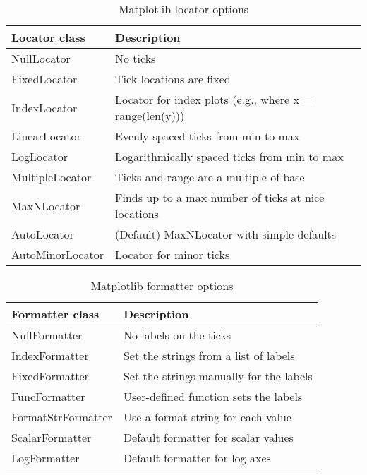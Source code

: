 \begin{table}
    \centering
    \caption{Matplotlib locator options}
    \label{Matplotlib locator options}
    \begin{tabular}{ll}
        \hline
        Locator class    & Description                                             \\
        \hline
        NullLocator      & No ticks                                                \\
        FixedLocator     & Tick locations are fixed                                \\
        IndexLocator     & Locator for index plots (e.g., where x = range(len(y))) \\
        LinearLocator    & Evenly spaced ticks from min to max                     \\
        LogLocator       & Logarithmically spaced ticks from min to max            \\
        MultipleLocator  & Ticks and range are a multiple of base                  \\
        MaxNLocator      & Finds up to a max number of ticks at nice locations     \\
        AutoLocator      & (Default) MaxNLocator with simple defaults              \\
        AutoMinorLocator & Locator for minor ticks                                 \\
        \hline
    \end{tabular}
\end{table}

\begin{table}
    \centering
    \caption{Matplotlib formatter options}
    \label{Matplotlib formatter options}
    \begin{tabular}{ll}
        \hline
        Formatter class    & Description                             \\
        \hline
        NullFormatter      & No labels on the ticks                  \\
        IndexFormatter     & Set the strings from a list of labels   \\
        FixedFormatter     & Set the strings manually for the labels \\
        FuncFormatter      & User-defined function sets the labels   \\
        FormatStrFormatter & Use a format string for each value      \\
        ScalarFormatter    & Default formatter for scalar values     \\
        LogFormatter       & Default formatter for log axes          \\
        \hline
    \end{tabular}
\end{table}